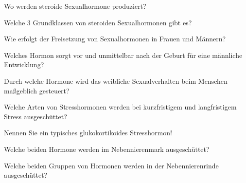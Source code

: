 \documentclass[10pt, a4paper]{exam}
\begin{document}
\begin{questions}
\begin{solution}
  \end{solution}

  \question Wo werden steroide Sexualhormone produziert?
  \begin{solution}

  \end{solution}

  \question Welche 3 Grundklassen von steroiden Sexualhormonen gibt es?
  \begin{solution}

  \end{solution}

  \question Wie erfolgt der Freisetzung von Sexualhormonen in Frauen und Männern?
  \begin{solution}

  \end{solution}

  \question Welches Hormon sorgt vor und unmittelbar nach der Geburt für eine männliche Entwicklung?
  \begin{solution}

  \end{solution}

  \question Durch welche Hormone wird das weibliche Sexualverhalten beim Menschen maßgeblich gesteuert?
  \begin{solution}

  \end{solution}

  \question Welche Arten von Stresshormonen werden bei kurzfristigem und langfristigem Stress ausgeschüttet?
  \begin{solution}

  \end{solution}

  \question Nennen Sie ein typisches glukokortikoides Stresshormon!
  \begin{solution}

  \end{solution}

  \question Welche beiden Hormone werden im Nebennierenmark ausgeschüttet?
  \begin{solution}

  \end{solution}

  \question Welche beiden Gruppen von Hormonen werden in der Nebennierenrinde ausgeschüttet?
  \begin{solution}

  \end{solution}


\end{questions}
\end{document}
